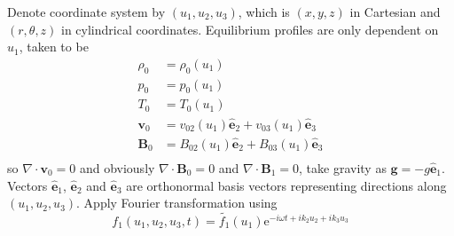 \documentclass[11pt, fleqn]{article}
\newcommand{\bv}{\boldsymbol{v}}
\newcommand{\bb}{\boldsymbol{B}}
\newcommand{\bg}{\boldsymbol{g}}
\newcommand{\ex}{\hat{\boldsymbol{e}}_1}
\newcommand{\ey}{\hat{\boldsymbol{e}}_2}
\newcommand{\ez}{\hat{\boldsymbol{e}}_3}
\begin{document}
\noindent
Denote coordinate system by $(u_1, u_2, u_3)$, which is $(x, y, z)$ in Cartesian and $(r, \theta, z)$ in cylindrical coordinates. Equilibrium profiles are only dependent on $u_1$, taken to be
\begin{equation}
	\begin{aligned}
		\rho_0	&= \rho_0(u_1)								\\
		p_0 	&= p_0(u_1)									\\
		T_0		&= T_0(u_1)									\\
		\bv_0 	&= v_{02}(u_1)\ey + v_{03}(u_1)\ez			\\
		\bb_0 	&= B_{02}(u_1)\ey + B_{03}(u_1)\ez			\\
	\end{aligned}
\end{equation}
so $\nabla \cdot \bv_0 = 0$ and obviously $\nabla \cdot \bb_0 = 0$ and $\nabla \cdot \bb_1 = 0$, take gravity as $\bg = -g\ex$. Vectors $\ex$, $\ey$ and $\ez$ are orthonormal basis vectors representing directions along $(u_1, u_2, u_3)$. Apply Fourier transformation using
\begin{equation}
	f_1(u_1, u_2, u_3, t) = \widetilde{f_1}(u_1)\text{e}^{-i\omega t + ik_2u_2 + ik_3u_3}
\end{equation}
\end{document}
